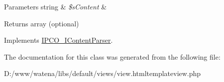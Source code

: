 \begin{DoxyParams}[1]{Parameters}
string & {\em \$s\-Content} & \\
\hline
\end{DoxyParams}
\begin{DoxyReturn}{Returns}
array (optional) 
\end{DoxyReturn}


Implements \hyperlink{interface_i_p_c_o___i_content_parser_a368c7cb30479f48b9148fbdd02934ef2}{I\-P\-C\-O\-\_\-\-I\-Content\-Parser}.



The documentation for this class was generated from the following file\-:\begin{DoxyCompactItemize}
\item 
D\-:/www/watena/libs/default/views/view.\-htmltemplateview.\-php\end{DoxyCompactItemize}

